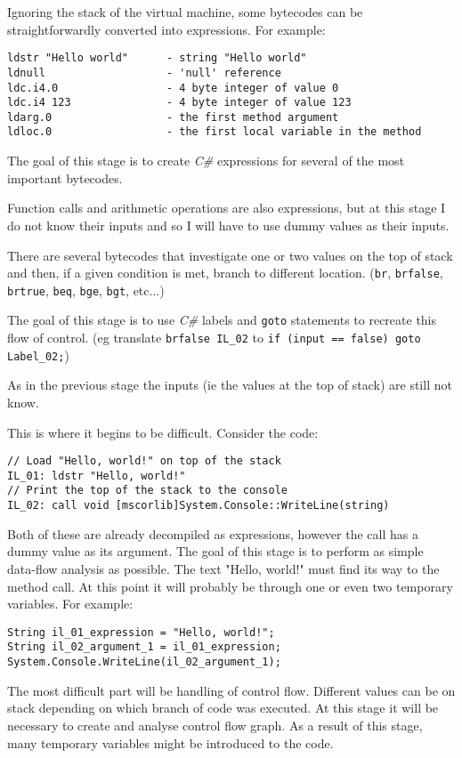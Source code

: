 \begin{enumerate}
Ignoring the stack of the virtual machine, some bytecodes can be 
straightforwardly converted into expressions.  For example:
\begin{verbatim}
ldstr "Hello world"      - string "Hello world"
ldnull                   - 'null' reference
ldc.i4.0                 - 4 byte integer of value 0
ldc.i4 123               - 4 byte integer of value 123
ldarg.0                  - the first method argument
ldloc.0                  - the first local variable in the method
\end{verbatim}

The goal of this stage is to create \emph{C\#} expressions for several of 
the most important bytecodes.

Function calls and arithmetic operations are also expressions, but at this 
stage I do not know their inputs and so I will have to use dummy values as 
their inputs.

There are several bytecodes that investigate one or two values on the top 
of stack and then, if a given condition is met, branch to different 
location.  (\verb|br|, \verb|brfalse|, \verb|brtrue|, \verb|beq|, 
\verb|bge|, \verb|bgt|, etc...)

The goal of this stage is to use \emph{C\#} labels and \verb|goto|
statements to recreate this flow of control.  (eg translate 
\verb|brfalse IL_02| to \verb|if (input == false) goto Label_02;|)

As in the previous stage the inputs (ie the values at the top of stack) are
still not know.

This is where it begins to be difficult.  Consider the code:
\begin{verbatim}
// Load "Hello, world!" on top of the stack
IL_01: ldstr "Hello, world!"
// Print the top of the stack to the console
IL_02: call void [mscorlib]System.Console::WriteLine(string)
\end{verbatim}
Both of these are already decompiled as expressions, however the call 
has a dummy value as its argument.  The goal of this stage is to perform 
as simple data-flow analysis as possible.  The text "Hello, world!" must 
find its way to the method call.  At this point it will probably be through 
one or even two temporary variables.  For example:
\begin{verbatim}
String il_01_expression = "Hello, world!";
String il_02_argument_1 = il_01_expression;
System.Console.WriteLine(il_02_argument_1);
\end{verbatim}
The most difficult part will be handling of control flow.  Different values 
can be on stack depending on which branch of code was executed.  At this 
stage it will be necessary to create and analyse control flow graph.  As a 
result of this stage, many temporary variables might be introduced to the 
code.


\end{enumerate}
